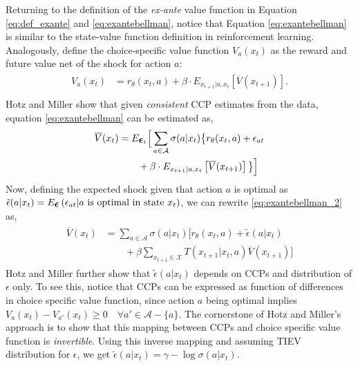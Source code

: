 \documentclass{article}
\renewcommand{\vec}[1]{\mbox{\bm{$#1$}}}
\begin{document}
Returning to the definition of the \emph{ex-ante} value function in Equation \eqref{eq:def_exante} and \eqref{eq:exantebellman}, notice that Equation \eqref{eq:exantebellman} is similar to the state-value function definition in reinforcement learning. 
Analogously, define the choice-specific value function $V_a(x_t)$ as the reward and future value net of the shock for action $a$:
\begin{align}
\begin{split}
V_a(x_t) &= r_{\theta}(x_t,a)+\beta\cdot E_{x_{t+1}|a,x_t} \left[ \overline{V}(x_{t+1}) \right] .\\
\end{split}
\end{align}
Hotz and Miller  show that given \textit{consistent} CCP estimates from the data, equation \eqref{eq:exantebellman} can be estimated as,
\begin{align} \label{eq:exantebellman_2}
\begin{split}
\overline{V}(x_t) & = E_{\vec{\epsilon}_t}\Big[\sum_{a\in\mathcal{A}} \sigma(a|x_t) \big\{r_{\theta}(x_t,a)+\epsilon_{at} \\
& \qquad +\beta  \cdot E_{x_{t+1}|a,x_t} \left[ \overline{V}(x_{t+1}) \right] \big\}\Big]\\
\end{split}
\end{align}
Now, defining the expected shock given that action $a$ is optimal as $\tilde{\epsilon}(a|x_t) = E_{\vec{\epsilon}}\left( \epsilon_{at} |a\ \textrm{is optimal in state } x_t\right)$, we can rewrite \eqref{eq:exantebellman_2} as,
\begin{align} \label{eq:exantebellman_3}
\begin{split}
\overline{V}(x_t) & = \sum_{a\in\mathcal{A}} \sigma(a|x_t) \Big[r_{\theta}(x_t,a)+\tilde{\epsilon}(a|x_t) \\
& \qquad +\beta \sum_{x_{t+1}\in\mathcal{X}} T(x_{t+1}|x_t,a) \overline{V}(x_{t+1})\Big]
\end{split}
\end{align}
Hotz and Miller  further show that $\tilde{\epsilon}(a|x_t)$ depends on CCPs and distribution of $\epsilon$ only.
To see this, notice that CCPs can be expressed as function of differences in choice specific value function, since action $a$ being optimal implies $V_a(x_t)- V_{a'}(x_t)\geq 0 \quad\forall a'\in\mathcal{A} - \{a\}$. The cornerstone of Hotz and Miller's approach is to show that this mapping between CCPs and choice specific value function is \emph{invertible}. Using this inverse mapping and assuming TIEV distribution for $\epsilon$, we get $\tilde{\epsilon}(a|x_t) = \gamma - \log \sigma(a|x_t)$.
\end{document}
